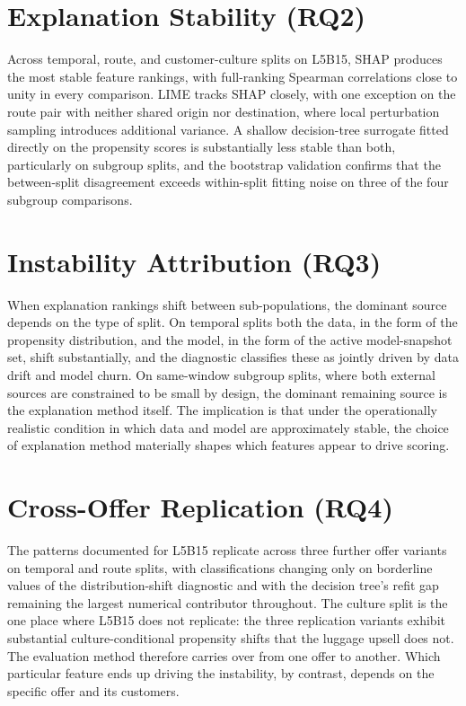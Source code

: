 \documentclass[oneside]{memoir} %
\begin{document}
\section{Explanation Stability (RQ2)}

Across temporal, route, and customer-culture splits on L5B15, SHAP produces the most stable feature rankings, with full-ranking Spearman correlations close to unity in every comparison. LIME tracks SHAP closely, with one exception on the route pair with neither shared origin nor destination, where local perturbation sampling introduces additional variance. A shallow decision-tree surrogate fitted directly on the propensity scores is substantially less stable than both, particularly on subgroup splits, and the bootstrap validation confirms that the between-split disagreement exceeds within-split fitting noise on three of the four subgroup comparisons.

\section{Instability Attribution (RQ3)}

When explanation rankings shift between sub-populations, the dominant source depends on the type of split. On temporal splits both the data, in the form of the propensity distribution, and the model, in the form of the active model-snapshot set, shift substantially, and the diagnostic classifies these as jointly driven by data drift and model churn. On same-window subgroup splits, where both external sources are constrained to be small by design, the dominant remaining source is the explanation method itself. The implication is that under the operationally realistic condition in which data and model are approximately stable, the choice of explanation method materially shapes which features appear to drive scoring.

\section{Cross-Offer Replication (RQ4)}

The patterns documented for L5B15 replicate across three further offer variants on temporal and route splits, with classifications changing only on borderline values of the distribution-shift diagnostic and with the decision tree's refit gap remaining the largest numerical contributor throughout. The culture split is the one place where L5B15 does not replicate: the three replication variants exhibit substantial culture-conditional propensity shifts that the luggage upsell does not. The evaluation method therefore carries over from one offer to another. Which particular feature ends up driving the instability, by contrast, depends on the specific offer and its customers.
\end{document}

